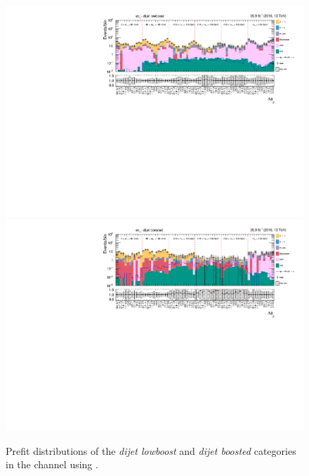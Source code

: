 \begin{figure}[h!]
    \centering      
        \includegraphics[width=\textwidth]{Figures/statana/Postfit_JEC_jdphi/prefit_htt_et_3_13TeV.pdf}\\
        \includegraphics[width=\textwidth]{Figures/statana/Postfit_JEC_jdphi/prefit_htt_et_4_13TeV.pdf}
    \caption{Prefit distributions of the \textit{dijet lowboost} and \textit{dijet boosted} categories in the \etau{} channel  using \jdphi{}.}
\end{figure}
\clearpage
